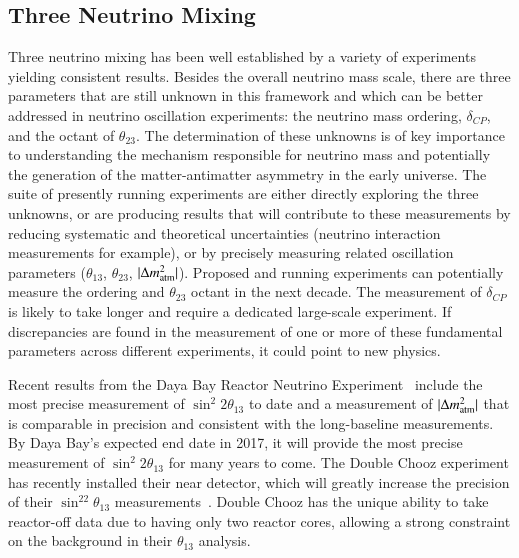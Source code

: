 \subsection{Three Neutrino Mixing}
\label{sec:3NuMixing}

Three neutrino mixing has been well established by a variety of
experiments yielding consistent results. Besides the overall neutrino
mass scale, there are three parameters that are still unknown in this
framework and which can be better addressed in neutrino oscillation
experiments: the neutrino mass ordering, $\delta_{CP}$, and the octant
of $\theta_{23}$.  The determination of these unknowns is of key
importance to understanding the mechanism responsible for neutrino
mass and potentially the generation of the matter-antimatter
asymmetry in the early universe.  The suite of presently running
experiments are either directly exploring the three unknowns, or are
producing results that will contribute to these measurements
by reducing systematic and theoretical uncertainties (neutrino
interaction measurements for example), or by precisely measuring
related oscillation parameters ($\theta_{13}$, $\theta_{23}$, $|\Delta
m^{2}_{\textnormal{atm}}|$).  Proposed and running experiments can
potentially measure the ordering and $\theta_{23}$ octant in the next
decade.  The measurement of $\delta_{CP}$ is likely to take longer and
require a dedicated large-scale experiment.  If discrepancies are
found in the measurement of one or more of these fundamental
parameters across different experiments, it could point to new
physics.

Recent results from the Daya Bay Reactor Neutrino
Experiment~\cite{Zhang:2015fya} include the most precise measurement
of $\sin^{2}2\theta_{13}$ to date and a measurement of $|\Delta
m^{2}_{\textnormal{atm}}|$ that is comparable in precision and
consistent with the long-baseline measurements.  By Daya Bay's
expected end date in 2017, it will provide the most precise
measurement of $\sin^{2}2\theta_{13}$ for many years to come.  The
Double Chooz experiment has recently installed their near detector,
which will greatly increase the precision of their
$\sin^22\theta_{13}$ measurements~\cite{Abe:2014bwa}. Double
Chooz has the unique ability to take reactor-off data due to having
only two reactor cores, allowing a strong constraint on the background
in their $\theta_{13}$ analysis.


